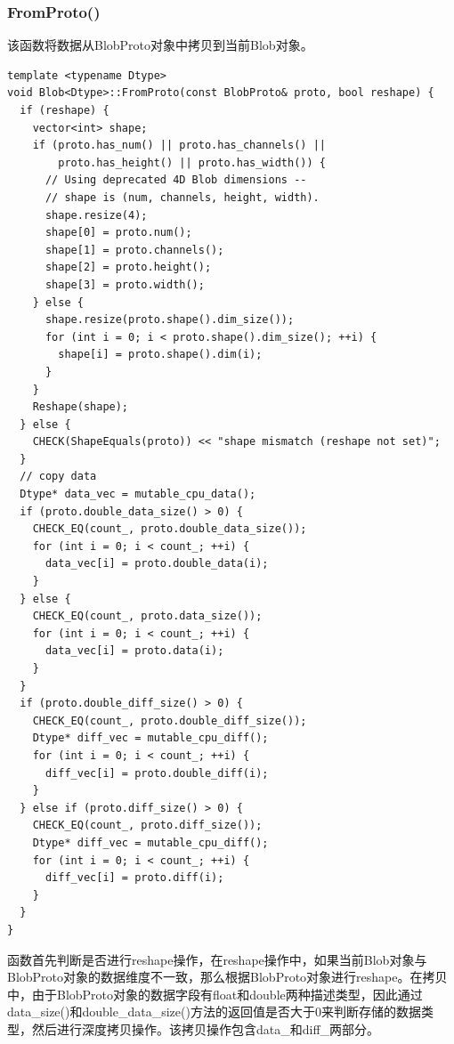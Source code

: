 \subsubsection{FromProto()}
该函数将数据从BlobProto对象中拷贝到当前Blob对象。
\begin{verbatim}
template <typename Dtype>
void Blob<Dtype>::FromProto(const BlobProto& proto, bool reshape) {
  if (reshape) {
    vector<int> shape;
    if (proto.has_num() || proto.has_channels() ||
        proto.has_height() || proto.has_width()) {
      // Using deprecated 4D Blob dimensions --
      // shape is (num, channels, height, width).
      shape.resize(4);
      shape[0] = proto.num();
      shape[1] = proto.channels();
      shape[2] = proto.height();
      shape[3] = proto.width();
    } else {
      shape.resize(proto.shape().dim_size());
      for (int i = 0; i < proto.shape().dim_size(); ++i) {
        shape[i] = proto.shape().dim(i);
      }
    }
    Reshape(shape);
  } else {
    CHECK(ShapeEquals(proto)) << "shape mismatch (reshape not set)";
  }
  // copy data
  Dtype* data_vec = mutable_cpu_data();
  if (proto.double_data_size() > 0) {
    CHECK_EQ(count_, proto.double_data_size());
    for (int i = 0; i < count_; ++i) {
      data_vec[i] = proto.double_data(i);
    }
  } else {
    CHECK_EQ(count_, proto.data_size());
    for (int i = 0; i < count_; ++i) {
      data_vec[i] = proto.data(i);
    }
  }
  if (proto.double_diff_size() > 0) {
    CHECK_EQ(count_, proto.double_diff_size());
    Dtype* diff_vec = mutable_cpu_diff();
    for (int i = 0; i < count_; ++i) {
      diff_vec[i] = proto.double_diff(i);
    }
  } else if (proto.diff_size() > 0) {
    CHECK_EQ(count_, proto.diff_size());
    Dtype* diff_vec = mutable_cpu_diff();
    for (int i = 0; i < count_; ++i) {
      diff_vec[i] = proto.diff(i);
    }
  }
}
\end{verbatim}
函数首先判断是否进行reshape操作，在reshape操作中，如果当前Blob对象与BlobProto对象的数据维度不一致，那么根据BlobProto对象进行reshape。在拷贝中，由于BlobProto对象的数据字段有float和double两种描述类型，因此通过data\_size()和double\_data\_size()方法的返回值是否大于0来判断存储的数据类型，然后进行深度拷贝操作。该拷贝操作包含data\_和diff\_两部分。
